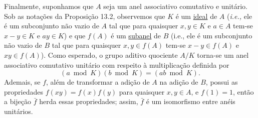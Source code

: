 Finalmente, suponhamos que $A$ seja um anel associativo comutativo e unitário. Sob as notações da Proposição 13.2, 
observemos que $K$ é um \underline{ideal} de $A$ (\emph{i.e.,} ele é um subconjunto não vazio de $A$ tal que para quaisquer 
$x,y \in K$ e $a \in A$ tem-se $x - y \in K$ e $ay \in K$) e que $f(A)$ é um \underline{subanel} de $B$ (i.e., ele é um 
subconjunto não vazio de $B$ tal que para quaisquer $x,y \in f(A)$ tem-se $x - y \in f(A)$ e $xy \in f(A)$). Como esperado, 
o grupo aditivo quociente $A/K$ torna-se um anel associativo comutativo unitário com respeito à multiplicação definida por
\[
(a \bmod K)(b \bmod K) = (ab \bmod K).
\]
Ademais, se $f$, além de transformar a adição de $A$ na adição de $B$, possui as propriedades $f(xy) = f(x)f(y)$ para quaisquer 
$x,y \in A$, e $f(1) = 1$, então a bijeção $\bar{f}$ herda essas propriedades; assim, $\bar{f}$ é um isomorfismo entre anéis unitários.


